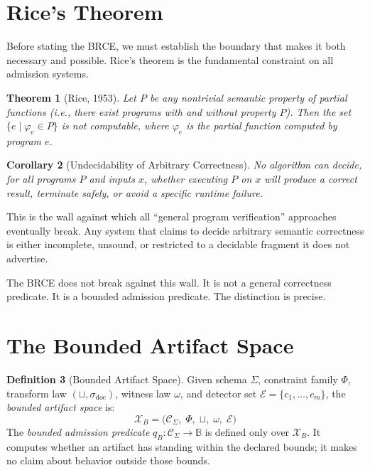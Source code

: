 \documentclass[12pt, letterpaper]{report}
\theoremstyle{plain}
\newtheorem{theorem}{Theorem}[chapter]
\newtheorem{corollary}[theorem]{Corollary}
\theoremstyle{definition}
\newtheorem{definition}[theorem]{Definition}
\theoremstyle{remark}
\newcommand{\BB}{\mathbb{B}}
\newcommand{\CC}{\mathcal{C}}
\newcommand{\EE}{\mathcal{E}}
\begin{document}
\section{Rice's Theorem}

Before stating the BRCE, we must establish the boundary that makes it
both necessary and possible. Rice's theorem is the fundamental constraint
on all admission systems.

\begin{theorem}[Rice, 1953]
\label{thm:rice}
Let $P$ be any nontrivial semantic property of partial functions
(i.e., there exist programs with and without property $P$).
Then the set $\{e \mid \varphi_e \in P\}$ is not computable,
where $\varphi_e$ is the partial function computed by program $e$.
\end{theorem}

\begin{corollary}[Undecidability of Arbitrary Correctness]
No algorithm can decide, for all programs $P$ and inputs $x$,
whether executing $P$ on $x$ will produce a correct result,
terminate safely, or avoid a specific runtime failure.
\end{corollary}

This is the wall against which all ``general program verification'' approaches
eventually break. Any system that claims to decide arbitrary semantic
correctness is either incomplete, unsound, or restricted to a decidable
fragment it does not advertise.

The BRCE does not break against this wall. It is not a general correctness
predicate. It is a bounded admission predicate. The distinction is precise.

\section{The Bounded Artifact Space}

\begin{definition}[Bounded Artifact Space]
\label{def:xb}
Given schema $\Sigma$, constraint family $\Phi$, transform law
$(\sqcup, \sigma_{\mathrm{doc}})$, witness law $\omega$, and detector
set $\EE = \{c_1, \ldots, c_m\}$,
the \emph{bounded artifact space} is:
\[
  \mathcal{X}_B = \bigl(\CC_\Sigma,\; \Phi,\; \sqcup,\; \omega,\; \EE\bigr)
\]
The \emph{bounded admission predicate} $q_B : \CC_\Sigma \to \BB$
is defined only over $\mathcal{X}_B$.
It computes whether an artifact has standing within the declared bounds;
it makes no claim about behavior outside those bounds.
\end{definition}
\end{document}
